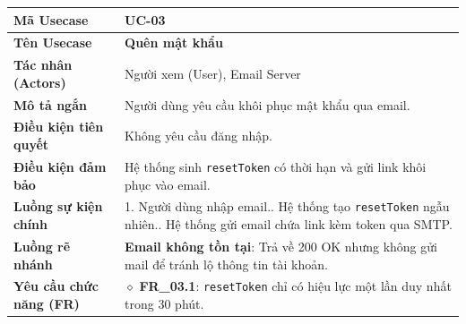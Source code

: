 \begin{table}[H]
\renewcommand{\arraystretch}{1.3}
\centering
\begin{tabularx}{\textwidth}{|p{4.5cm}|X|}
\hline
\cellcolor{gray!15}\bfseries Mã Usecase & \textbf{UC-03} \\ \hline
\cellcolor{gray!15}\bfseries Tên Usecase & \textbf{Quên mật khẩu} \\ \hline
\cellcolor{gray!15}\bfseries Tác nhân (Actors) & Người xem (User), Email Server \\ \hline
\cellcolor{gray!15}\bfseries Mô tả ngắn & Người dùng yêu cầu khôi phục mật khẩu qua email. \\ \hline
\cellcolor{gray!15}\bfseries Điều kiện tiên quyết & Không yêu cầu đăng nhập. \\ \hline
\cellcolor{gray!15}\bfseries Điều kiện đảm bảo & Hệ thống sinh \texttt{resetToken} có thời hạn và gửi link khôi phục vào email. \\ \hline
\cellcolor{gray!15}\bfseries Luồng sự kiện chính & 1. Người dùng nhập email.\newline 2. Hệ thống tạo \texttt{resetToken} ngẫu nhiên.\newline 3. Hệ thống gửi email chứa link kèm token qua SMTP. \\ \hline
\cellcolor{gray!15}\bfseries Luồng rẽ nhánh & \textbf{Email không tồn tại}: Trả về 200 OK nhưng không gửi mail để tránh lộ thông tin tài khoản. \\ \hline
\cellcolor{gray!15}\bfseries Yêu cầu chức năng (FR) & $\diamond$ \textbf{FR\_03.1}: \texttt{resetToken} chỉ có hiệu lực một lần duy nhất trong 30 phút. \\ \hline
\end{tabularx}
\end{table}

